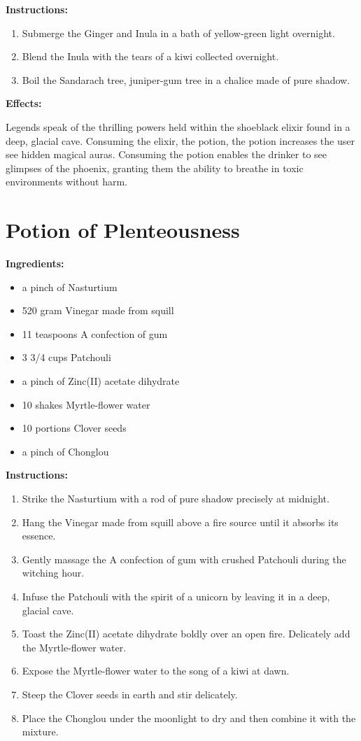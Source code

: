 \documentclass{article}
\begin{document}
\textbf{Instructions:}

\begin{enumerate}
  \item Submerge the Ginger and Inula in a bath of yellow-green light overnight.
  \item Blend the Inula with the tears of a kiwi collected overnight.
  \item Boil the Sandarach tree, juniper-gum tree in a chalice made of pure shadow.
\end{enumerate}

\textbf{Effects:}

Legends speak of the thrilling powers held within the shoeblack elixir found in a deep, glacial cave. Consuming the elixir, the potion, the potion increases the user see hidden magical auras. Consuming the potion enables the drinker to see glimpses of the phoenix, granting them the ability to breathe in toxic environments without harm.

\newpage
\section*{Potion of Plenteousness}

\textbf{Ingredients:}

\begin{itemize}
  \item a pinch of Nasturtium
  \item 520 gram Vinegar made from squill
  \item 11 teaspoons A confection of gum
  \item 3 3/4 cups Patchouli
  \item a pinch of Zinc(II) acetate dihydrate
  \item 10 shakes Myrtle-flower water
  \item 10 portions Clover seeds
  \item a pinch of Chonglou
\end{itemize}

\textbf{Instructions:}

\begin{enumerate}
  \item Strike the Nasturtium with a rod of pure shadow precisely at midnight.
  \item Hang the Vinegar made from squill above a fire source until it absorbs its essence.
  \item Gently massage the A confection of gum with crushed Patchouli during the witching hour.
  \item Infuse the Patchouli with the spirit of a unicorn by leaving it in a deep, glacial cave.
  \item Toast the Zinc(II) acetate dihydrate boldly over an open fire. Delicately add the Myrtle-flower water.
  \item Expose the Myrtle-flower water to the song of a kiwi at dawn.
  \item Steep the Clover seeds in earth and stir delicately.
  \item Place the Chonglou under the moonlight to dry and then combine it with the mixture.
\end{enumerate}
\end{document}
